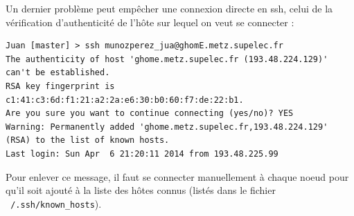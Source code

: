 \par Un dernier problème peut empêcher une connexion directe en ssh, celui de la vérification d'authenticité de l'hôte sur lequel on veut se connecter : 
\begin{verbatim}
Juan [master] > ssh munozperez_jua@ghomE.metz.supelec.fr
The authenticity of host 'ghome.metz.supelec.fr (193.48.224.129)' 
can't be established.
RSA key fingerprint is c1:41:c3:6d:f1:21:a2:2a:e6:30:b0:60:f7:de:22:b1.
Are you sure you want to continue connecting (yes/no)? YES
Warning: Permanently added 'ghome.metz.supelec.fr,193.48.224.129' 
(RSA) to the list of known hosts.
Last login: Sun Apr  6 21:20:11 2014 from 193.48.225.99
\end{verbatim}

\par Pour enlever ce message, il faut se connecter manuellement à chaque noeud pour qu'il soit ajouté à la liste des hôtes connus (listés dans le fichier \texttt{~/.ssh/known\_hosts}).




